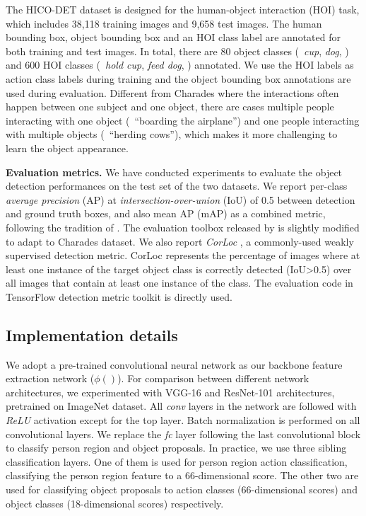 The HICO-DET dataset is designed for the human-object interaction (HOI) task, which includes 38,118 training images and 9,658 test images. The human bounding box, object bounding box and an HOI class label are annotated for both training and test images. In total, there are 80 object classes (\eg~\textit{cup}, \textit{dog}, \etc) and 600 HOI classes (\eg~\textit{hold cup}, \textit{feed dog}, \etc) annotated. We use the HOI labels as action class labels during training and the object bounding box annotations are used during evaluation. Different from Charades where the interactions often happen between one subject and one object, there are cases multiple people interacting with one object (\eg~``boarding the airplane'') and one people interacting with multiple objects (\eg~``herding cows''), which makes it more challenging to learn the object appearance.

\textbf{Evaluation metrics.} We have conducted experiments to evaluate the object detection performances on the test set of the two datasets. We report per-class \textit{average precision} (AP) at \textit{intersection-over-union} (IoU) of 0.5 between detection and ground truth boxes, and also mean AP (mAP) as a combined metric, following the tradition of \cite{yuan2017temporal}. The evaluation toolbox released by \cite{girshick2015fast} is slightly modified to adapt to Charades dataset. We also report \textit{CorLoc} \cite{deselaers2012weakly}, a commonly-used weakly supervised detection metric. CorLoc represents the percentage of images where at least one instance of the target object class is correctly detected (IoU\textgreater0.5) over all images that contain at least one instance of the class. The evaluation code in TensorFlow detection metric toolkit is directly used.

\subsection{Implementation details}
We adopt a pre-trained convolutional neural network as our backbone feature extraction network ($\phi()$). For comparison between different network architectures, we experimented with VGG-16 and ResNet-101 architectures, pretrained on ImageNet dataset. All \textit{conv} layers in the network are followed with \textit{ReLU} activation except for the top layer. Batch normalization \cite{ioffe2015batch} is performed on all convolutional layers. We replace the \textit{fc} layer following the last convolutional block to classify person region and object proposals. In practice, we use three sibling classification layers. One of them is used for person region action classification, classifying the person region feature to a 66-dimensional score. The other two are used for classifying object proposals to action classes (66-dimensional scores) and object classes (18-dimensional scores) respectively.

